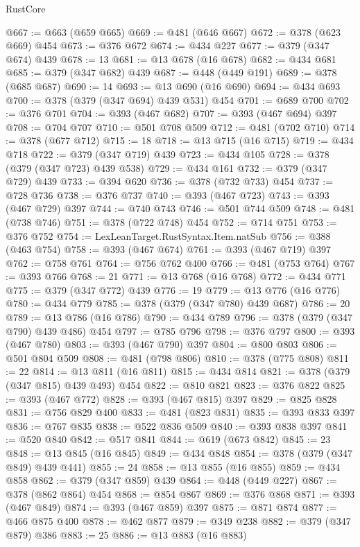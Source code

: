 \begin{lexlean}{RustCore}
\begin{coremodule}
@667 := @663 (@659 @665)
@669 := @481 (@646 @667)
@672 := @378 (@623 @669) @454
@673 := @376 @672
@674 := @434 @227
@677 := @379 (@347 @674) @439
@678 := 13
@681 := @13 @678 (@16 @678)
@682 := @434 @681
@685 := @379 (@347 @682) @439
@687 := @448 (@449 @191)
@689 := @378 (@685 @687)
@690 := 14
@693 := @13 @690 (@16 @690)
@694 := @434 @693
@700 := @378 (@379 (@347 @694) @439 @531) @454
@701 := @689 @700
@702 := @376 @701
@704 := @393 (@467 @682)
@707 := @393 (@467 @694) @397
@708 := @704 @707
@710 := @501 @708 @509
@712 := @481 (@702 @710)
@714 := @378 (@677 @712)
@715 := 18
@718 := @13 @715 (@16 @715)
@719 := @434 @718
@722 := @379 (@347 @719) @439
@723 := @434 @105
@728 := @378 (@379 (@347 @723) @439 @538)
@729 := @434 @161
@732 := @379 (@347 @729) @439
@733 := @394 @620
@736 := @378 (@732 @733) @454
@737 := @728 @736
@738 := @376 @737
@740 := @393 (@467 @723)
@743 := @393 (@467 @729) @397
@744 := @740 @743
@746 := @501 @744 @509
@748 := @481 (@738 @746)
@751 := @378 (@722 @748) @454
@752 := @714 @751
@753 := @376 @752
@754 := LexLeanTarget.RustSyntax.Item.natSub
@756 := @388 (@463 @754)
@758 := @393 (@467 @674)
@761 := @393 (@467 @719) @397
@762 := @758 @761
@764 := @756 @762 @400
@766 := @481 (@753 @764)
@767 := @393 @766
@768 := 21
@771 := @13 @768 (@16 @768)
@772 := @434 @771
@775 := @379 (@347 @772) @439
@776 := 19
@779 := @13 @776 (@16 @776)
@780 := @434 @779
@785 := @378 (@379 (@347 @780) @439 @687)
@786 := 20
@789 := @13 @786 (@16 @786)
@790 := @434 @789
@796 := @378 (@379 (@347 @790) @439 @486) @454
@797 := @785 @796
@798 := @376 @797
@800 := @393 (@467 @780)
@803 := @393 (@467 @790) @397
@804 := @800 @803
@806 := @501 @804 @509
@808 := @481 (@798 @806)
@810 := @378 (@775 @808)
@811 := 22
@814 := @13 @811 (@16 @811)
@815 := @434 @814
@821 := @378 (@379 (@347 @815) @439 @493) @454
@822 := @810 @821
@823 := @376 @822
@825 := @393 (@467 @772)
@828 := @393 (@467 @815) @397
@829 := @825 @828
@831 := @756 @829 @400
@833 := @481 (@823 @831)
@835 := @393 @833 @397
@836 := @767 @835
@838 := @522 @836 @509
@840 := @393 @838 @397
@841 := @520 @840
@842 := @517 @841
@844 := @619 (@673 @842)
@845 := 23
@848 := @13 @845 (@16 @845)
@849 := @434 @848
@854 := @378 (@379 (@347 @849) @439 @441)
@855 := 24
@858 := @13 @855 (@16 @855)
@859 := @434 @858
@862 := @379 (@347 @859) @439
@864 := @448 (@449 @227)
@867 := @378 (@862 @864) @454
@868 := @854 @867
@869 := @376 @868
@871 := @393 (@467 @849)
@874 := @393 (@467 @859) @397
@875 := @871 @874
@877 := @466 @875 @400
@878 := @462 @877
@879 := @349 @238
@882 := @379 (@347 @879) @386
@883 := 25
@886 := @13 @883 (@16 @883)

\end{coremodule}
\end{lexlean}
